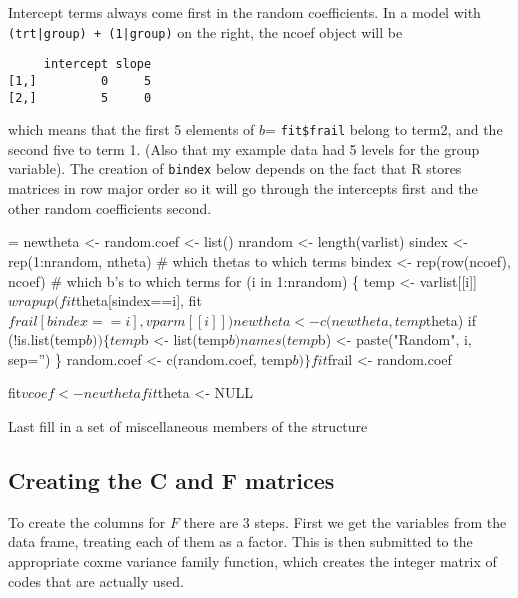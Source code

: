 \documentclass{article}
\begin{document}
Intercept terms always come first in the random coefficients.
In a model with \texttt{(trt|group) + (1|group)} on the
right, the ncoef object will be
\begin{verbatim}
     intercept slope
[1,]         0     5
[2,]         5     0
\end{verbatim}
which means that the first 5 elements of $b$= \verb!fit$frail!
belong to term2, and the second five to term 1. (Also that
my example data had 5 levels for the group variable).
The creation of \Verb!bindex! below depends on the fact that R
stores matrices in row major order so it will go through
the intercepts first and the other random coefficients second.
\begin{nwchunk}
=
 newtheta <- random.coef <- list()  
 nrandom <- length(varlist)
 sindex <- rep(1:nrandom, ntheta) # which thetas to which terms
 bindex <- rep(row(ncoef), ncoef) # which b's to which terms
 for (i in 1:nrandom) \{
     temp <- varlist[[i]]$wrapup(fit$theta[sindex==i], fit$frail[bindex==i], 
                                 vparm[[i]])
     newtheta <- c(newtheta, temp$theta)
     if (!is.list(temp$b)) \{
         temp$b <- list(temp$b)
         names(temp$b) <- paste("Random", i, sep='')
         \}
     random.coef <- c(random.coef, temp$b)
     \}
 fit$frail <- random.coef
 
 fit$vcoef <- newtheta
 fit$theta <- NULL
\end{nwchunk}
 
Last fill in a set of miscellaneous members of the structure

\subsection{Creating the C and F matrices}
To create the columns for $F$ there are 3 steps.
First we get the variables from the data frame, treating each of them
as a factor.  This is then submitted to the
appropriate coxme variance family function, which
creates the integer matrix of codes that are actually used.
\end{document}
